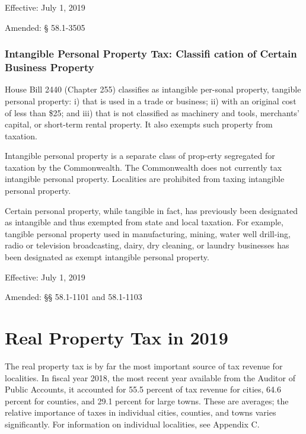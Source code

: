 \documentclass[
]{book}
\begin{document}
Effective: July 1, 2019

Amended: § 58.1-3505

\hypertarget{intangible-personal-property-tax-classifi-cation-of-certain-business-property}{%
\subsection{Intangible Personal Property Tax: Classifi cation of Certain Business Property}\label{intangible-personal-property-tax-classifi-cation-of-certain-business-property}}

House Bill 2440 (Chapter 255) classifies as intangible per-sonal property, tangible personal property: i) that is used in a trade or business; ii) with an original cost of less than \$25; and iii) that is not classified as machinery and tools, merchants' capital, or short-term rental property. It also exempts such property from taxation.

Intangible personal property is a separate class of prop-erty segregated for taxation by the Commonwealth. The Commonwealth does not currently tax intangible personal property. Localities are prohibited from taxing intangible personal property.

Certain personal property, while tangible in fact, has previously been designated as intangible and thus exempted from state and local taxation. For example, tangible personal property used in manufacturing, mining, water well drill-ing, radio or television broadcasting, dairy, dry cleaning, or laundry businesses has been designated as exempt intangible personal property.

Effective: July 1, 2019

Amended: §§ 58.1-1101 and 58.1-1103

\hypertarget{real-property-tax-in-2019}{%
\chapter{Real Property Tax in 2019}\label{real-property-tax-in-2019}}

The real property tax is by far the most important source of tax revenue for localities. In fiscal year 2018, the most recent year available from the Auditor of Public Accounts, it accounted for 55.5 percent of tax revenue for cities, 64.6 percent for counties, and 29.1 percent for large towns. These are averages; the relative importance of taxes in individual cities, counties, and towns varies significantly. For information on individual localities, see Appendix C.
\end{document}
